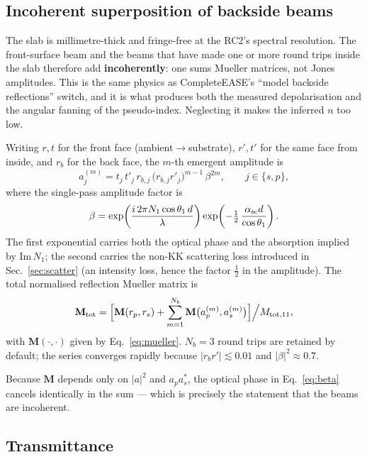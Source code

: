 \documentclass[11pt,a4paper]{article}
\newcommand{\lam}{\lambda}
\begin{document}
\subsection{Incoherent superposition of backside beams}

The slab is millimetre-thick and fringe-free at the RC2's spectral resolution.
The front-surface beam and the beams that have made one or more round trips
inside the slab therefore add \textbf{incoherently}: one sums Mueller matrices,
not Jones amplitudes. This is the same physics as CompleteEASE's ``model
backside reflections'' switch, and it is what produces both the measured
depolarisation and the angular fanning of the pseudo-index. Neglecting it makes
the inferred $n$ too low.

Writing $r,t$ for the front face (ambient$\to$substrate), $r',t'$ for the same
face from inside, and $r_b$ for the back face, the $m$-th emergent amplitude is
\begin{equation}
a^{(m)}_{j}=t_j\,t'_j\,r_{b,j}\,\bigl(r_{b,j}r'_j\bigr)^{m-1}\,\beta^{2m},
\qquad j\in\{s,p\},
\end{equation}
where the single-pass amplitude factor is
\begin{equation}
\beta=\exp\!\left(\frac{i\,2\pi N_1\cos\theta_1\,d}{\lam}\right)
      \exp\!\left(-\tfrac12\,\frac{\alpha_{\rm sc}d}{\cos\theta_1}\right).
\label{eq:beta}
\end{equation}
The first exponential carries both the optical phase and the absorption implied
by $\mathrm{Im}\,N_1$; the second carries the non-KK scattering loss introduced
in Sec.~\ref{sec:scatter} (an intensity loss, hence the factor $\tfrac12$ in the
amplitude). The total normalised reflection Mueller matrix is
\begin{equation}
\mathbf{M}_{\rm tot}=\Bigl[\mathbf{M}(r_p,r_s)+\sum_{m=1}^{N_b}
\mathbf{M}\bigl(a^{(m)}_p,a^{(m)}_s\bigr)\Bigr]\Big/ M_{{\rm tot},11},
\end{equation}
with $\mathbf{M}(\cdot,\cdot)$ given by Eq.~\eqref{eq:mueller}. $N_b=3$ round
trips are retained by default; the series converges rapidly because
$|r_b r'|\lesssim0.01$ and $|\beta|^2\approx0.7$.

Because $\mathbf{M}$ depends only on $|a|^2$ and $a_pa_s^*$, the optical phase
in Eq.~\eqref{eq:beta} cancels identically in the sum --- which is precisely the
statement that the beams are incoherent.

\subsection{Transmittance}
\end{document}
